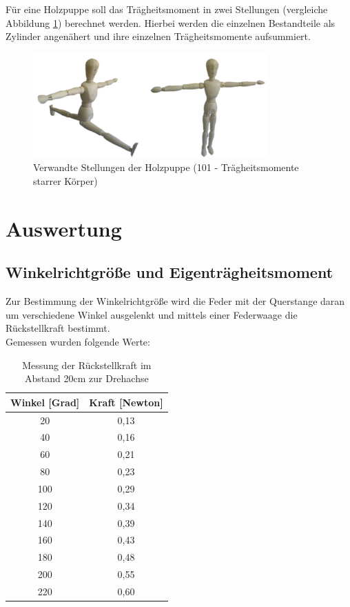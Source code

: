 Für eine Holzpuppe soll das Trägheitsmoment in zwei Stellungen (vergleiche Abbildung \ref{pic_puppe}) berechnet werden. Hierbei werden
die einzelnen Bestandteile als Zylinder angenähert und ihre einzelnen Trägheitsmomente aufsummiert.

\begin{figure}[H]
\includegraphics[width=0.8\textwidth]{pics/puppe.png}
\caption{Verwandte Stellungen der Holzpuppe (101 - Trägheitsmomente starrer Körper)}
\label{pic_puppe}
\end{figure}






\section{Auswertung}
\subsection{Winkelrichtgröße und Eigenträgheitsmoment}
Zur Bestimmung der Winkelrichtgröße wird die Feder mit der Querstange daran um verschiedene Winkel ausgelenkt und mittels einer Federwaage die Rückstellkraft bestimmt.\\
Gemessen wurden folgende Werte:
\begin{table}[htbp]
\begin{tabular}{|c|c|}
\hline 
Winkel [Grad]&	Kraft [Newton]\\ \hline
20	&0,13\\ \hline
40	&0,16\\ \hline
60	&0,21\\ \hline
80	&0,23\\ \hline
100	&0,29\\ \hline
120	&0,34\\ \hline
140	&0,39\\ \hline
160	&0,43\\ \hline
180	&0,48\\ \hline
200	&0,55\\ \hline
220	&0,60\\ \hline
\end{tabular} 
\caption{Messung der Rückstellkraft im Abstand 20cm zur Drehachse}
\end{table}

